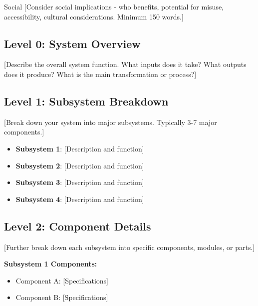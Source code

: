 \documentclass[final]{../designreport}
\begin{document}
\begin{impactstatement}{Social}
[Consider social implications - who benefits, potential for misuse, accessibility, cultural considerations. Minimum 150 words.]
\end{impactstatement}

\designsection


\functionaldecomp

\subsection{Level 0: System Overview}
[Describe the overall system function. What inputs does it take? What outputs does it produce? What is the main transformation or process?]


\subsection{Level 1: Subsystem Breakdown}
[Break down your system into major subsystems. Typically 3-7 major components.]

\begin{itemize}
    \item \textbf{Subsystem 1}: [Description and function]
    \item \textbf{Subsystem 2}: [Description and function]  
    \item \textbf{Subsystem 3}: [Description and function]
    \item \textbf{Subsystem 4}: [Description and function]
\end{itemize}

\subsection{Level 2: Component Details}
[Further break down each subsystem into specific components, modules, or parts.]

\textbf{Subsystem 1 Components:}
\begin{itemize}
    \item Component A: [Specifications]
    \item Component B: [Specifications]
\end{itemize}
\end{document}
